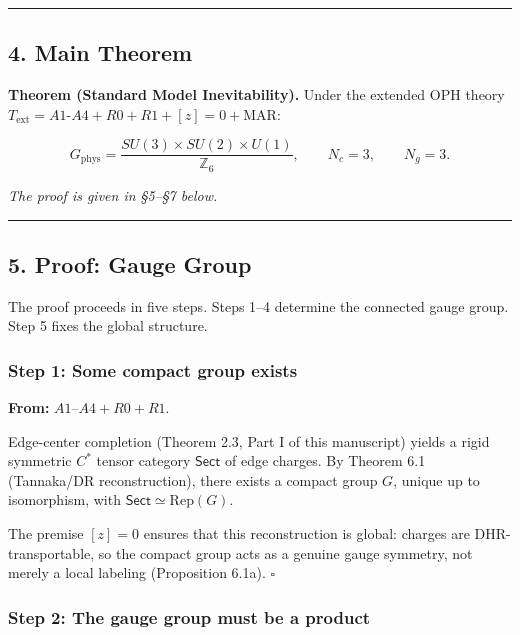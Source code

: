 \begin{center}\rule{0.5\linewidth}{0.5pt}\end{center}

\subsection{4. Main Theorem}\label{4-main-theorem}

\textbf{Theorem (Standard Model Inevitability).} Under the extended OPH theory \(T_{\mathrm{ext}} = A1\text{-}A4 + R0 + R1 + [z]=0 + \mathrm{MAR}\):

\[G_{\mathrm{phys}} = \frac{SU(3) \times SU(2) \times U(1)}{\mathbb{Z}_6}, \qquad N_c = 3, \qquad N_g = 3.\]

\emph{The proof is given in §5--§7 below.}

\begin{center}\rule{0.5\linewidth}{0.5pt}\end{center}

\subsection{5. Proof: Gauge Group}\label{5-proof-gauge-group}

The proof proceeds in five steps. Steps 1--4 determine the connected gauge group. Step 5 fixes the global structure.

\subsubsection{Step 1: Some compact group exists}\label{step-1-some-compact-group-exists}

\textbf{From:} \(A1\)--\(A4 + R0 + R1\).

Edge-center completion (Theorem 2.3, Part I of this manuscript) yields a rigid symmetric \(C^*\) tensor category \(\mathsf{Sect}\) of edge charges. By Theorem 6.1 (Tannaka/DR reconstruction), there exists a compact group \(G\), unique up to isomorphism, with \(\mathsf{Sect} \simeq \mathrm{Rep}(G)\).

The premise \([z] = 0\) ensures that this reconstruction is global: charges are DHR-transportable, so the compact group acts as a genuine gauge symmetry, not merely a local labeling (Proposition 6.1a). \(\square\)

\subsubsection{Step 2: The gauge group must be a product}\label{step-2-the-gauge-group-must-be-a-product}


